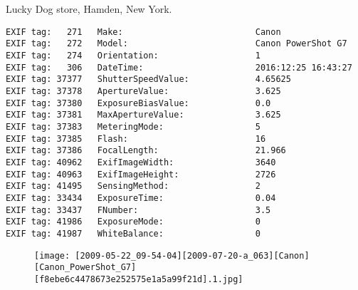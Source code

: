 \section{\protect{}}
\noindent Lucky Dog store, Hamden, New York.
\noindent
\begin{lstlisting}
EXIF tag:   271   Make:                          Canon
EXIF tag:   272   Model:                         Canon PowerShot G7
EXIF tag:   274   Orientation:                   1
EXIF tag:   306   DateTime:                      2016:12:25 16:43:27
EXIF tag: 37377   ShutterSpeedValue:             4.65625
EXIF tag: 37378   ApertureValue:                 3.625
EXIF tag: 37380   ExposureBiasValue:             0.0
EXIF tag: 37381   MaxApertureValue:              3.625
EXIF tag: 37383   MeteringMode:                  5
EXIF tag: 37385   Flash:                         16
EXIF tag: 37386   FocalLength:                   21.966
EXIF tag: 40962   ExifImageWidth:                3640
EXIF tag: 40963   ExifImageHeight:               2726
EXIF tag: 41495   SensingMethod:                 2
EXIF tag: 33434   ExposureTime:                  0.04
EXIF tag: 33437   FNumber:                       3.5
EXIF tag: 41986   ExposureMode:                  0
EXIF tag: 41987   WhiteBalance:                  0

\end{lstlisting}
\clearpage
\begin{figure}
\raggedleft
\texttt{[image: [2009-05-22\_09-54-04][2009-07-20-a\_063][Canon][Canon\_PowerShot\_G7][f8ebe6c4478673e252575e1a5a99f21d].1.jpg]}
\end{figure}


\clearpage
